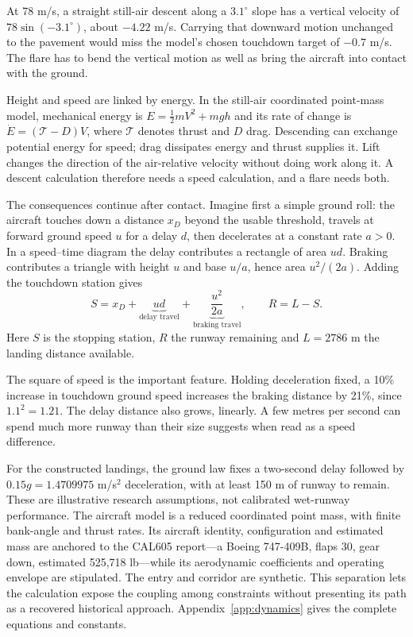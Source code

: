 \label{part:3}
At 78 m/s, a straight still-air descent along a $3.1^\circ$ slope has a vertical velocity of $78\sin(-3.1^\circ)$, about $-4.22$ m/s. Carrying that downward motion unchanged to the pavement would miss the model's chosen touchdown target of $-0.7$ m/s. The flare has to bend the vertical motion as well as bring the aircraft into contact with the ground.

Height and speed are linked by energy. In the still-air coordinated point-mass model, mechanical energy is $E=\tfrac12mV^2+mgh$ and its rate of change is $\dot E=(\mathcal T-D)V$, where $\mathcal T$ denotes thrust and $D$ drag. Descending can exchange potential energy for speed; drag dissipates energy and thrust supplies it. Lift changes the direction of the air-relative velocity without doing work along it. A descent calculation therefore needs a speed calculation, and a flare needs both.

The consequences continue after contact. Imagine first a simple ground roll: the aircraft touches down a distance $x_D$ beyond the usable threshold, travels at forward ground speed $u$ for a delay $d$, then decelerates at a constant rate $a>0$. In a speed--time diagram the delay contributes a rectangle of area $ud$. Braking contributes a triangle with height $u$ and base $u/a$, hence area $u^2/(2a)$. Adding the touchdown station gives
\begin{equation}
S=x_D+\underbrace{ud}_{\text{delay travel}}+\underbrace{\frac{u^2}{2a}}_{\text{braking travel}},\qquad R=L-S.
\label{eq:stop}
\end{equation}
Here $S$ is the stopping station, $R$ the runway remaining and $L=2786$ m the landing distance available.

The square of speed is the important feature. Holding deceleration fixed, a 10\% increase in touchdown ground speed increases the braking distance by 21\%, since $1.1^2=1.21$. The delay distance also grows, linearly. A few metres per second can spend much more runway than their size suggests when read as a speed difference.

For the constructed landings, the ground law fixes a two-second delay followed by $0.15g=1.4709975$ m/s$^2$ deceleration, with at least 150 m of runway to remain. These are illustrative research assumptions, not calibrated wet-runway performance. The aircraft model is a reduced coordinated point mass, with finite bank-angle and thrust rates. Its aircraft identity, configuration and estimated mass are anchored to the CAL605 report---a Boeing 747-409B, flaps 30, gear down, estimated 525,718 lb---while its aerodynamic coefficients and operating envelope are stipulated. The entry and corridor are synthetic. This separation lets the calculation expose the coupling among constraints without presenting its path as a recovered historical approach. Appendix~\ref{app:dynamics} gives the complete equations and constants.

